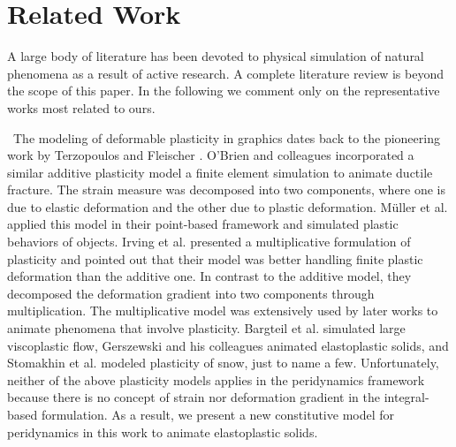 \section{Related Work}

A large body of literature has been devoted to physical simulation of natural phenomena as a result of active research. A complete literature review is beyond the scope of this paper. In the following we comment only on the representative works most related to ours.

~The modeling of deformable plasticity in graphics dates back to the pioneering work by Terzopoulos and Fleischer \cite{Terzopoulos:1988:MID:378456.378522}. O'Brien and colleagues \cite{O'Brien:2002:GMA:566654.566579} incorporated a similar additive plasticity model  a finite element simulation to animate ductile fracture. The strain measure was decomposed into two components, where one is due to elastic deformation and the other due to plastic deformation. M\"{u}ller et al. \cite{Muller:2004:PBA:1028523.1028542} applied this model in their point-based framework and simulated plastic behaviors of objects.  Irving et al. \cite{Irving:2004:IFE:1028523.1028541} presented a multiplicative formulation of plasticity and pointed out that their model was better handling finite plastic deformation than the additive one. In contrast to the additive model, they decomposed the deformation gradient into two components through multiplication. The multiplicative model was extensively used by later works to animate phenomena that involve plasticity. Bargteil et al. simulated large viscoplastic flow\cite{Bargteil:2007:FEM:1276377.1276397}, Gerszewski and his colleagues animated elastoplastic solids\cite{Gerszewski:2009:PMA:1599470.1599488}, and Stomakhin et al. modeled plasticity of snow\cite{Stomakhin:2013:MPM:2461912.2461948}, just to name a few. Unfortunately, neither of the above plasticity models applies in the peridynamics framework because there is no concept of strain nor deformation gradient in the integral-based formulation. As a result, we present a new constitutive model for peridynamics in this work to animate elastoplastic solids.

